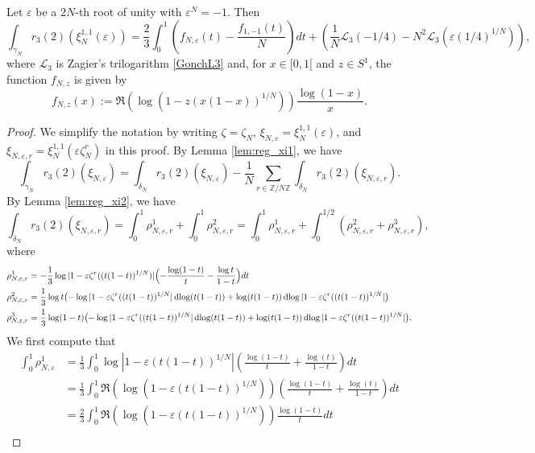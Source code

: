 \documentclass[10pt,a4paper]{amsart}
\newcommand{\Z}{\mathbb{Z}}
\newcommand{\dlog}{\operatorname{dlog}}
\newcommand{\e}{\varepsilon}
\newcommand{\z}{\zeta}
\begin{document}
\begin{thm}\label{regintN2}
    Let $\e$ be a $2N$-th root of unity with $\e^N=-1$. Then 
    \begin{equation*}
    \int_{\gamma_N} r_3(2)(\xi_{N}^{1,1}(\e))=\frac23  \int_0^1 \left(f_{N, \e}(t) - \frac{f_{1,-1}(t)}{N}\right) dt
      + \left(\frac1N \mathcal{L}_3(-1/4)-N^2 \mathcal{L}_3(\e (1/4)^{1/N})\right),
\end{equation*}
where $\mathcal{L}_3$ is Zagier's trilogarithm \eqref{GonchL3} and, for $x\in [0,1[$ and $z\in S^1$, the function $f_{N, z}$ is given by
\begin{equation*}
    f_{N,z}(x):=\Re(\log(1- z (x(1-x))^{1/N})) \frac{\log(1-x)}{x}.
\end{equation*}
\end{thm}

\begin{proof}
    We simplify the notation by writing $\z=\z_N$, $\xi_{N, \e}=\xi_N^{1,1}(\e)$, and $\xi_{N, \e, r}=\xi_N^{1,1}(\e \zeta_N^r)$ in this proof. By Lemma \ref{lem:reg_xi1}, we have 
\[
\int_{\gamma_N} r_3(2)(\xi_{N,\e})=\int_{\delta_N} r_3(2)(\xi_{N, \e}) - \frac{1}{N} \sum_{r \in \Z/N\Z} \int_{\delta_N} r_3(2)(\xi_{N, \e, r}).
\]
By Lemma \ref{lem:reg_xi2}, we have 
\[
\int_{\delta_N} r_3(2)(\xi_{N,\e, r})=\int_0^1 \rho_{N,\e, r}^1 + \int_0^{1} \rho_{N,\e, r}^2=\int_0^1 \rho_{N,\e, r}^1 + \int_0^{1/2} (\rho_{N,\e, r}^2 + \rho_{N,\e, r}^3),
\]
where 
\begin{align*}
    \rho_{N,\e, r}^1 & = -\frac13 \log |1- \e\zeta^r((t(1-t))^{1/N})| \Bigl( -\frac{\log (1-t)}{t} - \frac{\log t}{1-t} \Bigr) dt \\
    \rho_{N,\e, r}^2 & = \frac{1}{3} \log t \bigl( -\log |1 -\e \zeta^r((t(1-t))^{1/N}| \dlog (t(1-t)) + \log (t(1-t)) \dlog |1 -\e \zeta^r((t(1-t))^{1/N}|\bigr) \\
    \rho_{N,\e, r}^3 & = \frac{1}{3} \log (1-t) \bigl( -\log |1 -\e \zeta^r((t(1-t))^{1/N}| \dlog (t(1-t)) + \log (t(1-t)) \dlog |1 -\e \zeta^r((t(1-t))^{1/N}|\bigr).
\end{align*}
We first compute that
\begin{align*}
    \int_0^1 \rho_{N, \e}^1 & = \frac{1}{3}\int_0^1 \log|1-\e(t(1-t))^{1/N}| \left( \frac{\log(1-t)}{t} + \frac{\log(t)}{1-t} \right)dt \\ 
    & = \frac{1}{3}  \int_0^1 \Re(\log(1-\e(t(1-t))^{1/N})) \left( \frac{\log(1-t)}{t} + \frac{\log(t)}{1-t} \right)dt \\ 
    & =\frac{2}{3} \int_0^{1} \Re(\log(1 -\e(t(1-t))^{1/N})) \frac{\log(1-t)}{t} dt  \\

\end{align*}
\end{proof}
\end{document}

